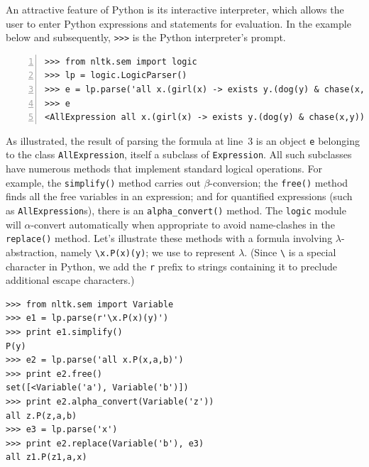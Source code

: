 \documentclass[11pt, a4paper]{article}
\begin{document}
An attractive feature of Python is its interactive interpreter,
which allows the user to enter Python expressions and statements for
evaluation. In the example below and subsequently, \verb!>>>! is the
Python interpreter's prompt. 
\begin{Verbatim}[numbers=left]
>>> from nltk.sem import logic
>>> lp = logic.LogicParser()
>>> e = lp.parse('all x.(girl(x) -> exists y.(dog(y) & chase(x,y)))')
>>> e
<AllExpression all x.(girl(x) -> exists y.(dog(y) & chase(x,y)))>
\end{Verbatim}
As illustrated, the result of parsing the formula at line~3 is an object
\texttt{e} belonging to the class \texttt{AllExpression}, itself a
subclass of \texttt{Expression}.  All such subclasses have numerous
methods that implement standard logical operations. For
example, the \texttt{simplify()} method carries out
$\beta$-conversion; the \texttt{free()} method finds
all the free variables in an expression; and for quantified expressions
(such as \texttt{AllExpression}s), there is an \texttt{alpha\_convert()}
method.  The \texttt{logic}
module will $\alpha$-convert automatically when appropriate to
avoid name-clashes in the \texttt{replace()} method. Let's illustrate
these methods
with a formula involving $\lambda$-abstraction, namely
\verb!\x.P(x)(y)!; we use \protect{\verb!\!} to represent
$\lambda$. (Since \verb!\! is a special character in Python,
we add the \texttt{r} prefix to strings containing it to preclude
additional escape characters.)
\begin{Verbatim}
>>> from nltk.sem import Variable
>>> e1 = lp.parse(r'\x.P(x)(y)')
>>> print e1.simplify()
P(y)
>>> e2 = lp.parse('all x.P(x,a,b)')
>>> print e2.free()
set([<Variable('a'), Variable('b')])
>>> print e2.alpha_convert(Variable('z'))
all z.P(z,a,b)
>>> e3 = lp.parse('x')
>>> print e2.replace(Variable('b'), e3)
all z1.P(z1,a,x)
\end{Verbatim}
\end{document}
